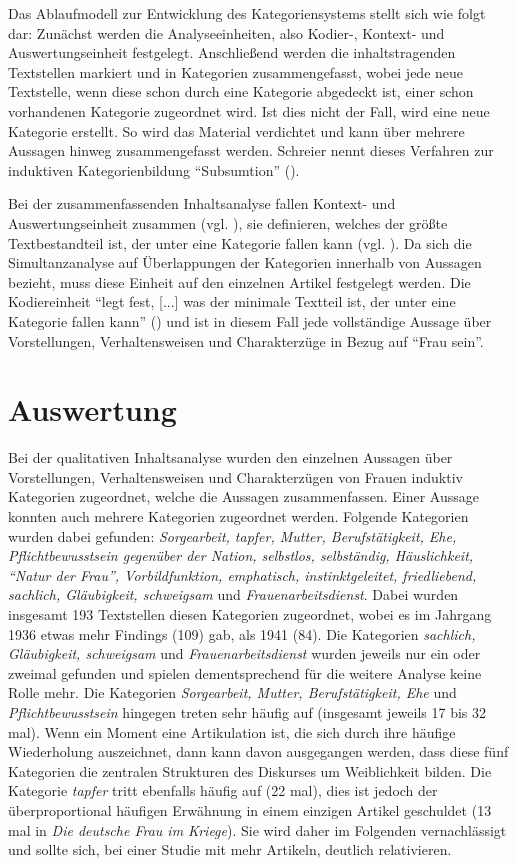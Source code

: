 \documentclass[12pt, titlepage=true, toc=bib]{scrartcl}
\begin{document}
{Das Ablaufmodell zur Entwicklung des Kategoriensystems stellt sich wie folgt dar: Zunächst werden die Analyseeinheiten, also Kodier-, Kontext- und Auswertungseinheit festgelegt. Anschließend werden die inhaltstragenden Textstellen markiert und in Kategorien zusammengefasst, wobei jede neue Textstelle, wenn diese schon durch eine Kategorie abgedeckt ist, einer schon vorhandenen Kategorie zugeordnet wird. Ist dies nicht der Fall, wird eine neue Kategorie erstellt. So wird das Material verdichtet und kann über mehrere Aussagen hinweg zusammengefasst werden. Schreier nennt dieses Verfahren zur induktiven Kategorienbildung "`Subsumtion"' (\cite[7]{schreier_varianten_2014}).

Bei der zusammenfassenden Inhaltsanalyse fallen Kontext- und Auswertungseinheit zusammen (vgl. \cite[71]{mayring_qualitative_2010}), sie definieren, welches der größte Textbestandteil ist, der unter eine Kategorie fallen kann (vgl. \cite[59]{mayring_qualitative_2010}). Da sich die Simultanzanalyse auf Überlappungen der Kategorien innerhalb von Aussagen bezieht, muss diese Einheit auf den einzelnen Artikel festgelegt werden. Die Kodiereinheit "`legt fest, [...] was der minimale Textteil ist, der unter eine Kategorie fallen kann"' (\cite[59]{mayring_qualitative_2010}) und ist in diesem Fall jede vollständige Aussage über Vorstellungen, Verhaltensweisen und Charakterzüge in Bezug auf "`Frau sein"'.

\section{Auswertung}

Bei der qualitativen Inhaltsanalyse wurden den einzelnen Aussagen über Vorstellungen, Verhaltensweisen und Charakterzügen von Frauen induktiv Kategorien zugeordnet, welche die Aussagen zusammenfassen. Einer Aussage konnten auch mehrere Kategorien zugeordnet werden. Folgende Kategorien wurden dabei gefunden: \textit{Sorgearbeit, tapfer, Mutter, Berufstätigkeit, Ehe, Pflichtbewusstsein gegenüber der Nation, selbstlos, selbständig, Häuslichkeit, "`Natur der Frau"', Vorbildfunktion, emphatisch, instinktgeleitet, friedliebend, sachlich, Gläubigkeit, schweigsam} und \textit{Frauenarbeitsdienst}. Dabei wurden insgesamt 193 Textstellen diesen Kategorien zugeordnet, wobei es im Jahrgang 1936 etwas mehr Findings (109) gab, als 1941 (84). Die Kategorien \textit{sachlich, Gläubigkeit, schweigsam} und \textit{Frauenarbeitsdienst} wurden jeweils nur ein oder zweimal gefunden und spielen dementsprechend für die weitere Analyse keine Rolle mehr. Die Kategorien \textit{Sorgearbeit, Mutter, Berufstätigkeit, Ehe} und \textit{Pflichtbewusstsein} hingegen treten sehr häufig auf (insgesamt jeweils 17 bis 32 mal). Wenn ein Moment eine Artikulation ist, die sich durch ihre häufige Wiederholung auszeichnet, dann kann davon ausgegangen werden, dass diese fünf Kategorien die zentralen Strukturen des Diskurses um Weiblichkeit bilden. Die Kategorie \textit{tapfer} tritt ebenfalls häufig auf (22 mal), dies ist jedoch der überproportional häufigen Erwähnung in einem einzigen Artikel geschuldet (13 mal in \textit{Die deutsche Frau im Kriege}). Sie wird daher im Folgenden vernachlässigt und sollte sich, bei einer Studie mit mehr Artikeln, deutlich relativieren.

}
\end{document}
